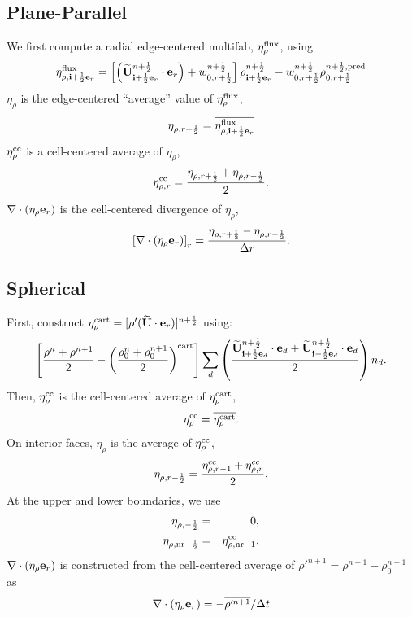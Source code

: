 \documentclass[11pt]{article}
\def\half   {\frac{1}{2}}
\def\eb         {{\bf e}}
\def\ib         {{\bf i}}
\def\Ub         {{\bf U}}
\newcommand{\Ubt}{\widetilde{\Ub}}
\def\etarho     {\eta_\rho}
\def\etarhocc   {\etarho^{\rm cc}}
\def\divetarho  {\nabla\cdot(\etarho\eb_r)}
\begin{document}
\subsection{Plane-Parallel}
We first compute a radial edge-centered multifab, $\eta_{\rho}^{\rm flux}$, using
\begin{equation}
\eta_{\rho,\ib+\half\eb_r}^{\rm flux} = \left[\left(\Ubt_{\ib+\half\eb_r}^{n+\half}\cdot\eb_r\right) + w_{0,r+\half}^{n+\half}\right] \rho_{\ib+\half\eb_r}^{n+\half} - w_{0,r+\half}^{n+\half}\rho_{0,r+\half}^{n+\half, {\rm pred}}
\end{equation}
$\etarho$ is the edge-centered ``average'' value of $\eta_{\rho}^{\rm flux}$,
\begin{equation}
\eta_{\rho,r+\half} = \overline{\eta_{\rho,\ib+\half\eb_r}^{\rm flux}}
\end{equation}
$\etarhocc$ is a cell-centered average of $\etarho$,
\begin{equation}
\eta_{\rho,r}^{\rm cc} = \frac{\eta_{\rho,r+\half} + \eta_{\rho,r-\half}}{2}.
\end{equation}
$\divetarho$ is the cell-centered divergence of $\etarho$,
\begin{equation}
\left[\divetarho\right]_r = \frac{\eta_{\rho,r+\half} - \eta_{\rho,r-\half}}{\Delta r}.
\end{equation}

\subsection{Spherical}
First, construct $\eta_{\rho}^{\rm cart} = [\rho'(\Ubt\cdot\eb_r)]^{n+\half}$ using:
\begin{equation}
\left[\frac{\rho^n+\rho^{n+1}}{2}-\left(\frac{\rho_0^n+\rho_0^{n+1}}{2}\right)^{\rm cart}\right] \sum_d\left(\frac{\Ubt_{\ib+\half\eb_d}^{n+\half}\cdot\eb_d+\Ubt_{\ib-\half\eb_d}^{n+\half}\cdot\eb_d}{2}\right)n_d.
\end{equation}
Then, $\etarhocc$ is the cell-centered average of $\eta_{\rho}^{\rm cart}$,
\begin{equation}
\etarhocc = \overline{\eta_{\rho}^{\rm cart}}.
\end{equation}
On interior faces, $\etarho$ is the average of $\etarhocc$,
\begin{equation}
\eta_{\rho,r-\half} = \frac{\eta_{\rho,r-1}^{\rm cc} + \eta_{\rho,r}^{\rm cc}}{2}.
\end{equation}
At the upper and lower boundaries, we use
\begin{eqnarray}
\eta_{\rho,-\half} &=& 0, \\
\eta_{\rho,{\rm nr}-\half} &=& \eta_{\rho,{\rm nr}-1}^{\rm cc}.
\end{eqnarray}
$\divetarho$ is constructed from the cell-centered average of $\rho'^{n+1} = \rho^{n+1} - \rho_0^{n+1}$ as
\begin{equation}
\divetarho = -\overline{\rho'^{n+1}}/\Delta t
\end{equation}
\end{document}
